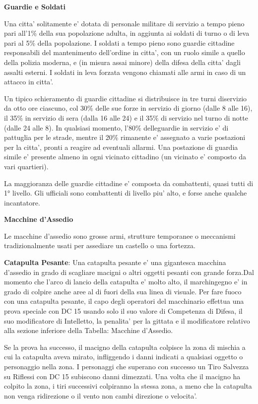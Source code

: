\documentclass[a4paper,11pt,twoside,openany]{book}
\begin{document}
{\textbf{Guardie e Soldati}

Una citta' solitamente e' dotata di personale militare di servizio a tempo pieno pari all'1\% della sua popolazione adulta, in aggiunta ai soldati di turno o di leva pari al 5\% della popolazione. I soldati a tempo pieno sono guardie cittadine responsabili del mantenimento dell'ordine in citta', con un ruolo simile a quello della polizia moderna, e (in misura assai minore) della difesa della citta' dagli assalti esterni. I soldati in leva forzata vengono chiamati alle armi in caso di un attacco in citta'.

Un tipico schieramento di guardie cittadine si distribuisce in tre turni diservizio da otto ore ciascuno, col 30\% delle sue forze in servizio di giorno (dalle 8 alle 16), il 35\% in servizio di sera (dalla 16 alle 24) e il 35\% di servizio nel turno di notte (dalle 24 alle 8). In qualsiasi momento, l'80\% delleguardie in servizio e' di pattuglia per le strade, mentre il 20\% rimanente e' assegnato a varie postazioni per la citta', pronti a reagire ad eventuali allarmi. Una postazione di guardia simile e' presente almeno in ogni vicinato cittadino (un vicinato e' composto da vari quartieri).

La maggioranza delle guardie cittadine e' composta da combattenti, quasi tutti di 1° livello. Gli ufficiali sono combattenti di livello piu' alto, e forse anche qualche incantatore.

\textbf{Macchine d'Assedio}

Le macchine d'assedio sono grosse armi, strutture temporanee o meccanismi tradizionalmente usati per assediare un castello o una fortezza.

\textbf{Catapulta Pesante}: Una catapulta pesante e' una gigantesca macchina d'assedio in grado di scagliare macigni o altri oggetti pesanti con grande forza.Dal momento che l'arco di lancio della catapulta e' molto alto, il marchingegno e' in grado di colpire anche aree al di fuori della sua linea di visuale. Per fare fuoco con una catapulta pesante, il capo degli operatori del macchinario effettua una prova speciale con DC 15 usando solo il suo valore di Competenza di Difesa, il suo modificatore di Intelletto, la penalita' per la gittata e il modificatore relativo alla sezione inferiore della Tabella: Macchine d'Assedio. 

Se la prova ha successo, il macigno della catapulta colpisce la zona di mischia a cui la catapulta aveva mirato, infliggendo i danni indicati a qualsiasi oggetto o personaggio nella zona. I personaggi che superano con successo un Tiro Salvezza su Riflessi con DC 15 subiscono danni dimezzati. Una volta che il macigno ha colpito la zona, i tiri successivi colpiranno la stessa zona, a meno che la catapulta non venga ridirezione o il vento non cambi direzione o velocita'.

}
\end{document}
